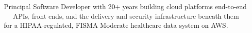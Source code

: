 \begin{cvparagraph}

Principal Software Developer with 20+ years building cloud platforms end-to-end --- APIs, front ends, and the delivery and security infrastructure beneath them --- for a HIPAA-regulated, FISMA Moderate healthcare data system on AWS.

\end{cvparagraph}
